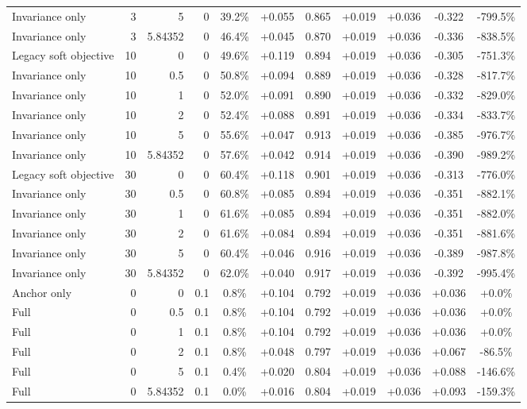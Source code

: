\begin{table}[htbp]
\begin{tabular}{lrrrccccccc}
Invariance only & 3 & 5 & 0 & 39.2\% & +0.055 & 0.865 & +0.019 & +0.036 & -0.322 & -799.5\% \\
Invariance only & 3 & 5.84352 & 0 & 46.4\% & +0.045 & 0.870 & +0.019 & +0.036 & -0.336 & -838.5\% \\
Legacy soft objective & 10 & 0 & 0 & 49.6\% & +0.119 & 0.894 & +0.019 & +0.036 & -0.305 & -751.3\% \\
Invariance only & 10 & 0.5 & 0 & 50.8\% & +0.094 & 0.889 & +0.019 & +0.036 & -0.328 & -817.7\% \\
Invariance only & 10 & 1 & 0 & 52.0\% & +0.091 & 0.890 & +0.019 & +0.036 & -0.332 & -829.0\% \\
Invariance only & 10 & 2 & 0 & 52.4\% & +0.088 & 0.891 & +0.019 & +0.036 & -0.334 & -833.7\% \\
Invariance only & 10 & 5 & 0 & 55.6\% & +0.047 & 0.913 & +0.019 & +0.036 & -0.385 & -976.7\% \\
Invariance only & 10 & 5.84352 & 0 & 57.6\% & +0.042 & 0.914 & +0.019 & +0.036 & -0.390 & -989.2\% \\
Legacy soft objective & 30 & 0 & 0 & 60.4\% & +0.118 & 0.901 & +0.019 & +0.036 & -0.313 & -776.0\% \\
Invariance only & 30 & 0.5 & 0 & 60.8\% & +0.085 & 0.894 & +0.019 & +0.036 & -0.351 & -882.1\% \\
Invariance only & 30 & 1 & 0 & 61.6\% & +0.085 & 0.894 & +0.019 & +0.036 & -0.351 & -882.0\% \\
Invariance only & 30 & 2 & 0 & 61.6\% & +0.084 & 0.894 & +0.019 & +0.036 & -0.351 & -881.6\% \\
Invariance only & 30 & 5 & 0 & 60.4\% & +0.046 & 0.916 & +0.019 & +0.036 & -0.389 & -987.8\% \\
Invariance only & 30 & 5.84352 & 0 & 62.0\% & +0.040 & 0.917 & +0.019 & +0.036 & -0.392 & -995.4\% \\
Anchor only & 0 & 0 & 0.1 & 0.8\% & +0.104 & 0.792 & +0.019 & +0.036 & +0.036 & +0.0\% \\
Full & 0 & 0.5 & 0.1 & 0.8\% & +0.104 & 0.792 & +0.019 & +0.036 & +0.036 & +0.0\% \\
Full & 0 & 1 & 0.1 & 0.8\% & +0.104 & 0.792 & +0.019 & +0.036 & +0.036 & +0.0\% \\
Full & 0 & 2 & 0.1 & 0.8\% & +0.048 & 0.797 & +0.019 & +0.036 & +0.067 & -86.5\% \\
Full & 0 & 5 & 0.1 & 0.4\% & +0.020 & 0.804 & +0.019 & +0.036 & +0.088 & -146.6\% \\
Full & 0 & 5.84352 & 0.1 & 0.0\% & +0.016 & 0.804 & +0.019 & +0.036 & +0.093 & -159.3\% \\

\end{tabular}
\end{table}
